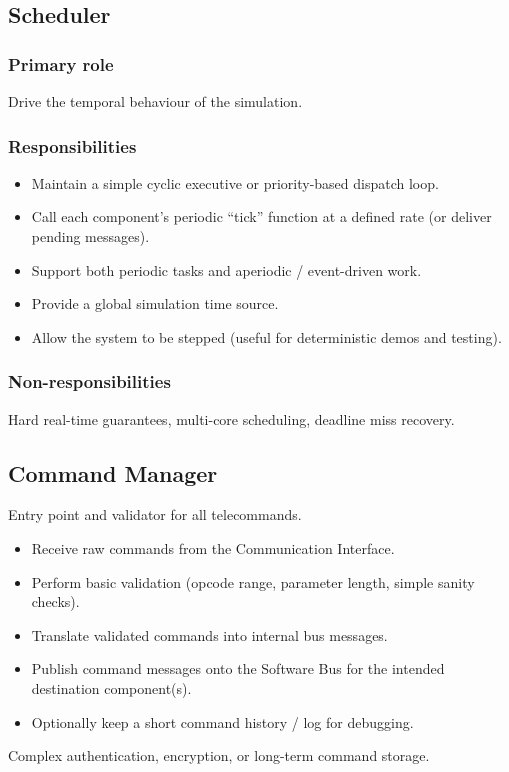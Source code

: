 \documentclass[11pt,a4paper]{article}
\begin{document}
\subsection{Scheduler}
\subsubsection*{Primary role}
Drive the temporal behaviour of the simulation.
\subsubsection*{Responsibilities}
\begin{itemize}
\item Maintain a simple cyclic executive or priority-based dispatch loop.
\item Call each component's periodic ``tick'' function at a defined rate (or deliver pending messages).
\item Support both periodic tasks and aperiodic / event-driven work.
\item Provide a global simulation time source.
\item Allow the system to be stepped (useful for deterministic demos and testing).
\end{itemize}
\subsubsection*{Non-responsibilities}
Hard real-time guarantees, multi-core scheduling, deadline miss recovery.

\subsection{Command Manager}
\begin{description}[style=nextline, leftmargin=1.5em]
    \item[Primary role] Entry point and validator for all telecommands.
    \item[Responsibilities]
    \begin{itemize}
        \item Receive raw commands from the Communication Interface.
        \item Perform basic validation (opcode range, parameter length, simple sanity checks).
        \item Translate validated commands into internal bus messages.
        \item Publish command messages onto the Software Bus for the intended destination component(s).
        \item Optionally keep a short command history / log for debugging.
    \end{itemize}
    \item[Non-responsibilities] Complex authentication, encryption, or long-term command storage.
\end{description}
\end{document}
